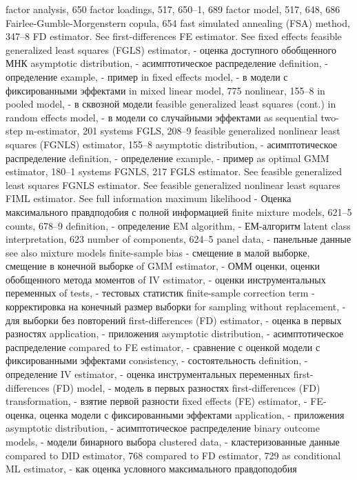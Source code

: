 factor analysis, 650
factor loadings, 517, 650–1, 689
factor model, 517, 648, 686 Fairlee-Gumble-Morgenstern copula, 654
fast simulated annealing (FSA) method, 347–8
FD estimator. See first-differences
FE estimator. See fixed effects
feasible generalized least squares (FGLS) estimator, - оценка доступного обобщенного МНК
asymptotic distribution, - асимптотическое распределение 
definition, - определение
example, - пример
in fixed effects model, - в модели с фиксированными эффектами 
in mixed linear model, 775 nonlinear, 155–8
in pooled model, - в сквозной модели
feasible generalized least squares (cont.)
in random effects model, - в модели со случайными эффектами
as sequential two-step m-estimator, 201 systems FGLS, 208–9
feasible generalized nonlinear least squares (FGNLS) estimator, 155–8
asymptotic distribution, - асимптотическое распределение 
definition, - определение
example, - пример
as optimal GMM estimator, 180–1 systems FGNLS, 217
FGLS estimator. See feasible generalized least squares FGNLS estimator. See feasible generalized nonlinear least squares
FIML estimator. See full information maximum likelihood - Оценка максимального правдподобия с полной информацией
finite mixture models, 621–5
counts, 678–9
definition, - определение
EM algorithm, - ЕМ-алгоритм
latent class interpretation, 623 
number of components, 624–5 
panel data, - панельные данные
see also mixture models
finite-sample bias - смещение в малой выборке, смещение в конечной выборке
of GMM estimator, - ОММ оценки, оценки обобщенного метода моментов
of IV estimator, - оценки инструментальных переменных
of tests, - тестовых статистик
finite-sample correction term - корректировка на конечный размер выборки
for sampling without replacement, - для выборки без повторений
first-differences (FD) estimator, - оценка в первых разностях
application, - приложения
asymptotic distribution, - асимптотическое распределение
compared to FE estimator, - сравнение с оценкой модели с фиксированными эффектами
consistency, - состоятельность
definition, - определение
IV estimator, - оценка инструментальных переменных
first-differences (FD) model, - модель в первых разностях
first-differences (FD) transformation, - взятие первой разности
fixed effects (FE) estimator, - FE-оценка, оценка модели с фиксированными эффектами
application, - приложения
asymptotic distribution, - асимптотическое распределение
binary outcome models, - модели бинарного выбора
clustered data, - кластеризованные данные
compared to DID estimator, 768
compared to FD estimator, 729
as conditional ML estimator, - как оценка условного максимального правдоподобия
